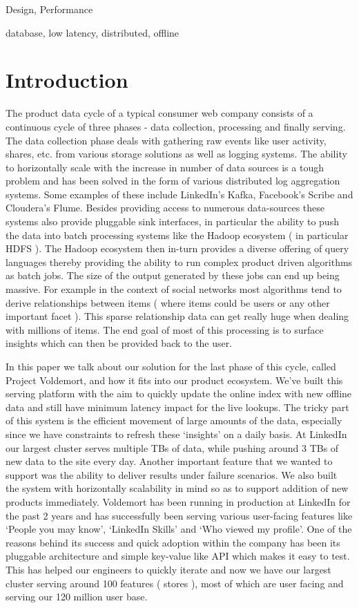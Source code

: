\documentclass[10pt,twocolumn,preprint,natbib,authoryear]{sigplanconf}
\begin{document}
\terms
Design, Performance

\keywords
database, low latency, distributed, offline


\section{Introduction}
\label{sec:introduction}
The product data cycle of a typical consumer web company consists of a continuous cycle of three phases - data collection, processing and finally serving. The data collection phase deals with gathering raw events like user activity, shares, etc. from various storage solutions as well as logging systems. The ability to horizontally scale with the increase in number of data sources is a tough problem and has been solved in the form of various distributed log aggregation systems. Some examples of these include LinkedIn's Kafka\cite{1}, Facebook's Scribe\cite{2} and Cloudera's Flume\cite{3}. Besides providing access to numerous data-sources these systems also provide pluggable sink interfaces, in particular the ability to push the data into batch processing systems like the Hadoop ecosystem ( in particular HDFS )\cite{4}. The Hadoop ecosystem then in-turn provides a diverse offering of query languages thereby providing the ability to run complex product driven algorithms as batch jobs. The size of the output generated by these jobs can end up being massive. For example in the context of social networks most algorithms tend to derive relationships between items ( where items could be users or any other important facet ). This sparse relationship data can get really huge when dealing with millions of items. The end goal of most of this processing is to surface insights which can then be provided back to the user.

In this paper we talk about our solution for the last phase of this cycle, called Project Voldemort, and how it fits into our product ecosystem. We've built this serving platform with the aim to quickly update the online index with new offline data and still have minimum latency impact for the live lookups. The tricky part of this system is the efficient movement of large amounts of the data, especially since we have constraints to refresh these `insights' on a daily basis. At LinkedIn our largest cluster serves multiple TBs of data, while pushing around 3 TBs of new data to the site every day. Another important feature that we wanted to support was the ability to deliver results under failure scenarios. We also built the system with horizontally scalability in mind so as to support addition of new products immediately. Voldemort has been running in production at LinkedIn for the past 2 years and has successfully been serving various user-facing features like `People you may know', `LinkedIn Skills' and `Who viewed my profile'. One of the reasons behind its success and quick adoption within the company has been its pluggable architecture and simple key-value like API which makes it easy to test. This has helped our engineers to quickly iterate and now we have our largest cluster serving around 100 features ( stores ), most of which are user facing and serving our 120 million user base.
\end{document}
